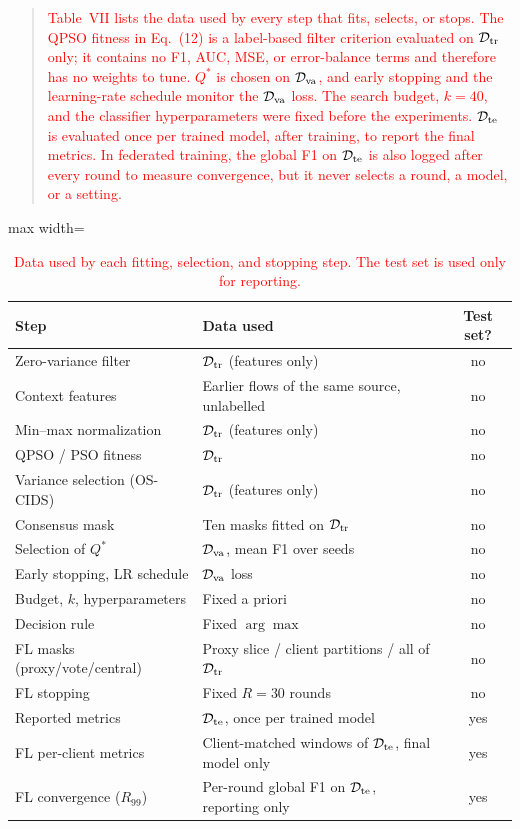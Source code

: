 \documentclass[11pt]{article}
\newenvironment{excerpt}{\begin{quote}\sloppy}{\end{quote}}
\begin{document}
\begin{excerpt}
\textcolor{red}{Table~VII lists the data
used by every step that fits, selects, or stops. The
QPSO fitness in Eq.~(12) is a label-based filter criterion
evaluated on $\mathcal{D}_{\rm tr}$ only; it contains no F1, AUC,
MSE, or error-balance terms and therefore has no weights to tune.
$Q^{*}$ is chosen on $\mathcal{D}_{\rm va}$, and early stopping and
the learning-rate schedule monitor the $\mathcal{D}_{\rm va}$ loss.
The search budget, $k=40$, and the classifier hyperparameters were
fixed before the experiments. $\mathcal{D}_{\rm te}$ is evaluated
once per trained model, after training, to report the final
metrics. In federated training, the global F1 on $\mathcal{D}_{\rm te}$
is also logged after every round to measure convergence, but it never
selects a round, a model, or a setting.}
\end{excerpt}
\setcounter{table}{6}
\begin{table}[H]
\centering
\scriptsize
\caption{\textcolor{red}{Data used by each fitting,
selection, and stopping step. The test set is used only for
reporting.}}

\color{red}
\setlength{\tabcolsep}{3pt}
\renewcommand{\arraystretch}{1.05}
\begin{adjustbox}{max width=\linewidth}
\begin{tabular}{p{2.6cm} p{3.6cm} c}
\hline\toprule
\textbf{Step} & \textbf{Data used} & \textbf{Test set?} \\
\hline\toprule
Zero-variance filter & $\mathcal{D}_{\rm tr}$ (features only) & no \\
Context features & Earlier flows of the same source, unlabelled & no \\
Min--max normalization & $\mathcal{D}_{\rm tr}$ (features only) & no \\
QPSO / PSO fitness & $\mathcal{D}_{\rm tr}$ & no \\
Variance selection (OS-CIDS) & $\mathcal{D}_{\rm tr}$ (features only) & no \\
Consensus mask & Ten masks fitted on $\mathcal{D}_{\rm tr}$ & no \\
Selection of $Q^{*}$ & $\mathcal{D}_{\rm va}$, mean F1 over seeds & no \\
Early stopping, LR schedule & $\mathcal{D}_{\rm va}$ loss & no \\
Budget, $k$, hyperparameters & Fixed a priori & no \\
Decision rule & Fixed $\arg\max$ & no \\
FL masks (proxy/vote/central) & Proxy slice / client partitions / all of $\mathcal{D}_{\rm tr}$ & no \\
FL stopping & Fixed $R=30$ rounds & no \\
\midrule
Reported metrics & $\mathcal{D}_{\rm te}$, once per trained model & yes \\
FL per-client metrics & Client-matched windows of $\mathcal{D}_{\rm te}$, final model only & yes \\
FL convergence ($R_{99}$) & Per-round global F1 on $\mathcal{D}_{\rm te}$, reporting only & yes \\
\hline\toprule
\end{tabular}
\end{adjustbox}
\end{table}
\end{document}
